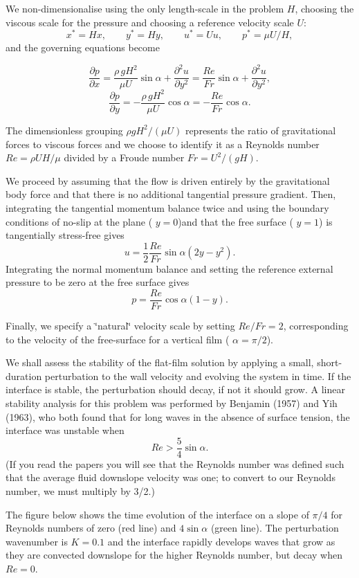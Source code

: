 We non-\/dimensionalise using the only length-\/scale in the problem $H$, choosing the viscous scale for the pressure and choosing a reference velocity scale $U$\+: \[ x^{*} = H x,\qquad y^{*} = H y,\qquad u^* = U u,\qquad p^* = \mu U/H,\] and the governing equations become \begin{center} \[ \frac{\partial p}{\partial x} = \frac{\rho \,g H^{2}}{\mu U} \sin\alpha + \frac{\partial^{2} u}{\partial y^{2}} = \frac{Re}{Fr} \sin \alpha + \frac{\partial^{2} u}{\partial y^{2}}, \] \[ \frac{\partial p}{\partial y} = -\frac{\rho \,g H^{2}}{\mu U} \cos\alpha = - \frac{Re}{Fr} \cos\alpha. \] \end{center}  The dimensionless grouping $ \rho g H^{2} / (\mu U) $ represents the ratio of gravitational forces to viscous forces and we choose to identify it as a Reynolds number $ Re = \rho U H / \mu$ divided by a Froude number $ Fr = U^{2} / (g H)$.

We proceed by assuming that the flow is driven entirely by the gravitational body force and that there is no additional tangential pressure gradient. Then, integrating the tangential momentum balance twice and using the boundary conditions of no-\/slip at the plane ( $y=0$)and that the free surface ( $y=1$) is tangentially stress-\/free gives \[ u = \frac{1}{2}\frac{Re}{Fr}\sin\alpha \left(2 y - y^{2}\right). \] Integrating the normal momentum balance and setting the reference external pressure to be zero at the free surface gives \[ p = \frac{Re}{Fr}\cos\alpha (1 - y).\]

Finally, we specify a \char`\"{}natural\char`\"{} velocity scale by setting $Re/Fr = 2$, corresponding to the velocity of the free-\/surface for a vertical film ( $\alpha = \pi/2$).

We shall assess the stability of the flat-\/film solution by applying a small, short-\/duration perturbation to the wall velocity and evolving the system in time. If the interface is stable, the perturbation should decay, if not it should grow. A linear stability analysis for this problem was performed by Benjamin (1957) and Yih (1963), who both found that for long waves in the absence of surface tension, the interface was unstable when \[ Re > \frac{5}{4} \sin\alpha. \] (If you read the papers you will see that the Reynolds number was defined such that the average fluid downslope velocity was one; to convert to our Reynolds number, we must multiply by 3/2.)

The figure below shows the time evolution of the interface on a slope of $ \pi/4 $ for Reynolds numbers of zero (red line) and $ 4 \sin\alpha $ (green line). The perturbation wavenumber is $ K = 0.1 $ and the interface rapidly develops waves that grow as they are convected downslope for the higher Reynolds number, but decay when $ Re = 0 $.

